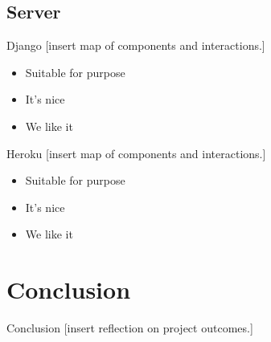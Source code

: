 \documentclass{beamer}
\begin{document}
\subsection{Server}

\begin{frame}{Django}
  [insert map of components and interactions.]
  \begin{itemize}
    \item Suitable for purpose
    \item It's nice
    \item We like it
  \end{itemize}
\end{frame}

\begin{frame}{Heroku}
  [insert map of components and interactions.]
  \begin{itemize}
    \item Suitable for purpose
    \item It's nice
    \item We like it
  \end{itemize}
\end{frame}


\section{Conclusion}

\begin{frame}{Conclusion}
  [insert reflection on project outcomes.]
\end{frame}
\end{document}
